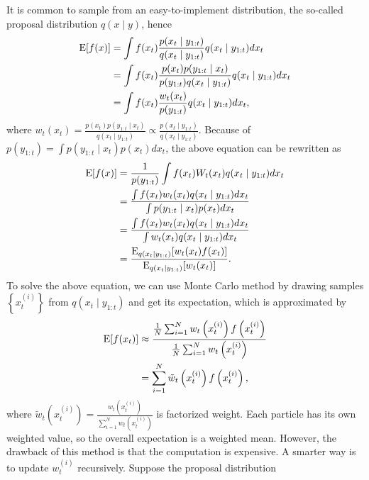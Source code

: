 It is common to sample from an easy-to-implement distribution, the so-called proposal distribution $q(x\mid y)$, hence
\begin{equation}
\begin{split}
\mathrm{E}\lbrack f(x) \rbrack &= \int f(x_t )\frac{p(x_t \mid y_{1:t})}{q(x_t \mid y_{1:t})} q(x_t \mid y_{1:t})dx_t\\
&= \int f(x_t )\frac{p(x_t )p(y_{1:t}\mid x_t )}{p(y_{1:t})q(x_t \mid y_{1:t})} q(x_t \mid y_{1:t})dx_t\\
&= \int f(x_t )\frac{w_t (x_t )}{p(y_{1:t})} q(x_t \mid y_{1:t})dx_t,
\end{split}
\end{equation}
where $w_t (x_t )=\frac{p(x_t )p(y_{1:t}\mid x_t )}{q(x_t \mid y_{1:t})} \propto \frac{p(x_t \mid y_{1:t})}{q(x_t \mid y_{1:t})}$. Because of $p(y_{1:t})=\int p(y_{1:t}\mid x_t )p(x_t )dx_t $, the above equation can be rewritten as
\begin{equation}
\begin{split}
\mathrm{E}\lbrack f(x)\rbrack&= \frac{1}{p(y_{1:t})}\int f(x_t )W_t (x_t )q(x_t \mid y_{1:t})dx_t \\
&= \frac{ \int f(x_t )w_t (x_t )q(x_t \mid y_{1:t})dx_t  }{\int p(y_{1:t}\mid x_t )p(x_t )dx_t } \\
&= \frac{ \int f(x_t )w_t (x_t )q(x_t \mid y_{1:t})dx_t  }{\int w_t (x_t )q(x_t \mid y_{1:t})dx_t } \\
&= \frac{\mathrm{E}_{q(x_t \mid y_{1:t})}[w_t (x_t )f(x_t )]}{\mathrm{E}_{q(x_t \mid y_{1:t})}[w_t (x_t )]}.
\end{split}
\end{equation}
To solve the above equation, we can use Monte Carlo method by drawing samples $\left\lbrace x_t^{(i)}\right\rbrace$ from $q(x_t \mid y_{1:t})$ and get its expectation, which is approximated by 
\begin{align}\label{PFexpectation}
\begin{split}
\mathrm{E}\lbrack f(x_t )\rbrack &\approx \frac{\frac{1}{N} \sum_{i=1}^{N} w_t\left(x_t^{(i)}\right)f\left(x_t^{(i)}\right)} {\frac{1}{N} \sum_{i=1}^{N} w_t\left(x_t^{(i)}\right)}\\
&= \sum_{i=1}^{N} \tilde{w}_t\left(x_t^{(i)}\right)f\left(x_t^{(i)}\right),
\end{split}
\end{align}
where $\tilde{w}_t\left(x_t^{(i)}\right) = \frac{ w_t\left(x_t^{(i)}\right)}{\sum_{i=1}^Nw_t\left(x_t^{(i)}\right)}$ is factorized weight. Each particle has its own weighted value, so the overall expectation is a weighted mean. However, the drawback of this method is that the computation is expensive. A smarter way is to update $w_t^{(i)}$ recursively. Suppose the proposal distribution 
